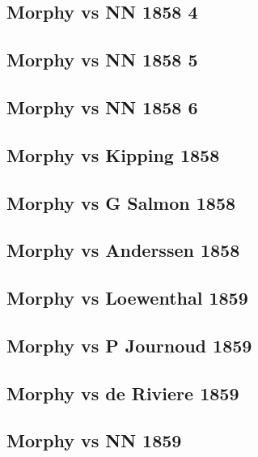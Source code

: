 \documentclass[]{book}
\begin{document}
\subsection{Morphy vs NN 1858 4}\label{morphy-vs-nn-1858-4}

\subsection{Morphy vs NN 1858 5}\label{morphy-vs-nn-1858-5}

\subsection{Morphy vs NN 1858 6}\label{morphy-vs-nn-1858-6}

\subsection{Morphy vs Kipping 1858}\label{morphy-vs-kipping-1858}

\subsection{Morphy vs G Salmon 1858}\label{morphy-vs-g-salmon-1858}

\subsection{Morphy vs Anderssen 1858}\label{morphy-vs-anderssen-1858}

\subsection{Morphy vs Loewenthal 1859}\label{morphy-vs-loewenthal-1859}

\subsection{Morphy vs P Journoud 1859}\label{morphy-vs-p-journoud-1859}

\subsection{Morphy vs de Riviere 1859}\label{morphy-vs-de-riviere-1859}

\subsection{Morphy vs NN 1859}\label{morphy-vs-nn-1859}
\end{document}
